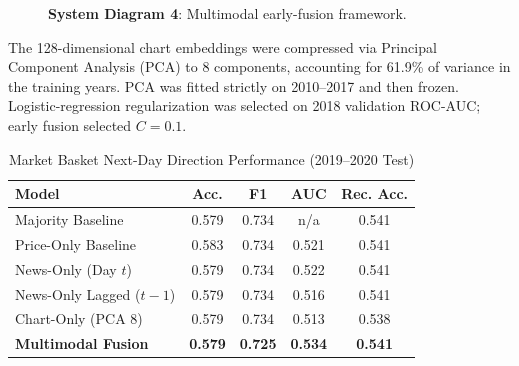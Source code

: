 \documentclass[10pt,journal]{IEEEtran}
\begin{document}
\begin{figure}[htbp]
\centering
{}
\caption{\textbf{System Diagram 4}: Multimodal early-fusion framework.}
\label{fig:diag_fusion}
\end{figure}

The 128-dimensional chart embeddings were compressed via Principal Component Analysis (PCA) to 8 components, accounting for 61.9\% of variance in the training years. PCA was fitted strictly on 2010--2017 and then frozen. Logistic-regression regularization was selected on 2018 validation ROC-AUC; early fusion selected $C=0.1$.

\begin{table}[htbp]
\centering
\caption{Market Basket Next-Day Direction Performance (2019--2020 Test)}
\label{tab:market_results}
\scriptsize
\setlength{\tabcolsep}{2pt}
\begin{tabular}{lcccc}
\toprule
\textbf{Model} & \textbf{Acc.} & \textbf{F1} & \textbf{AUC} & \textbf{Rec. Acc.} \\
\midrule
Majority Baseline & 0.579 & 0.734 & n/a & 0.541 \\
Price-Only Baseline & 0.583 & 0.734 & 0.521 & 0.541 \\
News-Only (Day $t$) & 0.579 & 0.734 & 0.522 & 0.541 \\
News-Only Lagged ($t-1$) & 0.579 & 0.734 & 0.516 & 0.541 \\
Chart-Only (PCA 8) & 0.579 & 0.734 & 0.513 & 0.538 \\
\textbf{Multimodal Fusion} & \textbf{0.579} & \textbf{0.725} & \textbf{0.534} & \textbf{0.541} \\
\bottomrule
\end{tabular}
\end{table}
\end{document}
